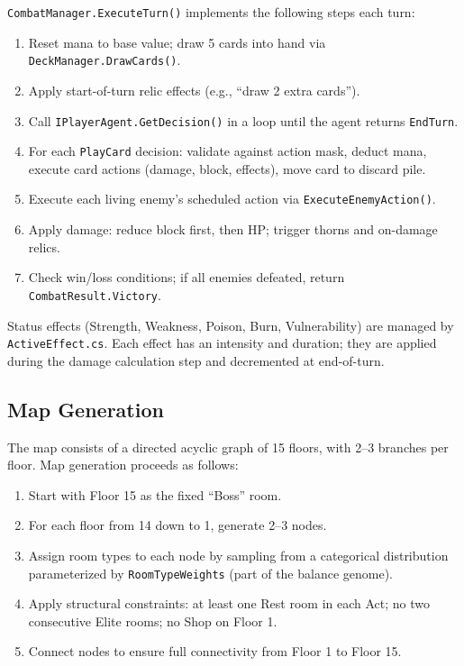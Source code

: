 \texttt{CombatManager.ExecuteTurn()} implements the following steps each turn:

\begin{enumerate}
    \item Reset mana to base value; draw 5 cards into hand via \texttt{DeckManager.DrawCards()}.
    \item Apply start-of-turn relic effects (e.g., ``draw 2 extra cards'').
    \item Call \texttt{IPlayerAgent.GetDecision()} in a loop until the agent returns \texttt{EndTurn}.
    \item For each \texttt{PlayCard} decision: validate against action mask, deduct mana, execute card actions (damage, block, effects), move card to discard pile.
    \item Execute each living enemy's scheduled action via \texttt{ExecuteEnemyAction()}.
    \item Apply damage: reduce block first, then HP; trigger thorns and on-damage relics.
    \item Check win/loss conditions; if all enemies defeated, return \texttt{CombatResult.Victory}.
\end{enumerate}

Status effects (Strength, Weakness, Poison, Burn, Vulnerability) are managed by \texttt{ActiveEffect.cs}. Each effect has an intensity and duration; they are applied during the damage calculation step and decremented at end-of-turn.

\subsection{Map Generation}

The map consists of a directed acyclic graph of 15 floors, with 2--3 branches per floor. Map generation proceeds as follows:

\begin{enumerate}
    \item Start with Floor 15 as the fixed ``Boss'' room.
    \item For each floor from 14 down to 1, generate 2--3 nodes.
    \item Assign room types to each node by sampling from a categorical distribution parameterized by \texttt{RoomTypeWeights} (part of the balance genome).
    \item Apply structural constraints: at least one Rest room in each Act; no two consecutive Elite rooms; no Shop on Floor 1.
    \item Connect nodes to ensure full connectivity from Floor 1 to Floor 15.
\end{enumerate}

